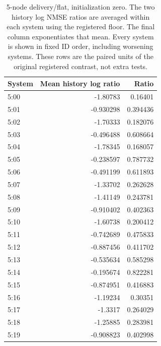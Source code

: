 \begin{table}[ht]
\centering\scriptsize
\begin{tabular}{lrr}
\toprule
System & Mean history log ratio & Ratio\\
\midrule
5:00 & -1.80783 & 0.16401\\
5:01 & -0.930298 & 0.394436\\
5:02 & -1.70333 & 0.182076\\
5:03 & -0.496488 & 0.608664\\
5:04 & -1.78345 & 0.168057\\
5:05 & -0.238597 & 0.787732\\
5:06 & -0.491199 & 0.611893\\
5:07 & -1.33702 & 0.262628\\
5:08 & -1.41149 & 0.243781\\
5:09 & -0.910402 & 0.402363\\
5:10 & -1.60738 & 0.200412\\
5:11 & -0.742689 & 0.475833\\
5:12 & -0.887456 & 0.411702\\
5:13 & -0.535634 & 0.585298\\
5:14 & -0.195674 & 0.822281\\
5:15 & -0.874951 & 0.416883\\
5:16 & -1.19234 & 0.30351\\
5:17 & -1.3317 & 0.264029\\
5:18 & -1.25885 & 0.283981\\
5:19 & -0.908823 & 0.402998\\
\bottomrule
\end{tabular}
\caption{5-node delivery/flat, initialization zero. The two history log NMSE ratios are averaged within each system using the registered floor. The final column exponentiates that mean. Every system is shown in fixed ID order, including worsening systems. These rows are the paired units of the original registered contrast, not extra tests.}
\end{table}

